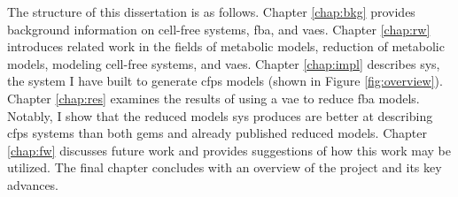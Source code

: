 The structure of this dissertation is as follows.
Chapter \ref{chap:bkg} provides background information on cell-free systems, \gls{fba}, and \glspl{vae}.
Chapter \ref{chap:rw} introduces related work in the fields of metabolic models, reduction of metabolic models, modeling cell-free systems, and \glspl{vae}.
Chapter \ref{chap:impl} describes \gls{sys}, the system I have built to generate \gls{cfps} models (shown in Figure \ref{fig:overview}).
Chapter \ref{chap:res} examines the results of using a \gls{vae} to reduce \gls{fba} models.
Notably, I show that the reduced models \gls{sys} produces are better at describing \gls{cfps} systems than both \glspl{gem} and already published reduced models.
Chapter \ref{chap:fw} discusses future work and provides suggestions of how this work may be utilized.
The final chapter concludes with an overview of the project and its key advances.
